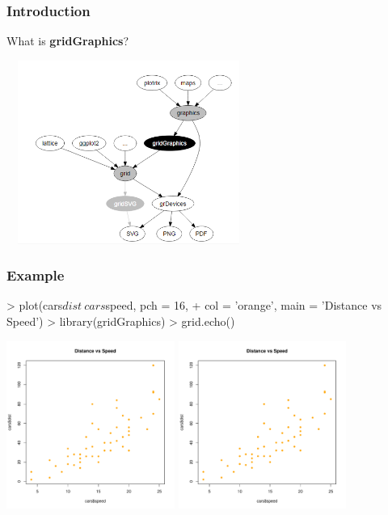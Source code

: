 \documentclass{beamer}
\begin{document}

\begin{frame}[fragile]

\frametitle{Introduction}

What is \textbf{gridGraphics}?
\begin{center}
\includegraphics[width = 8cm, height = 6cm]{plot/grid_graphics.png}
\end{center}

\end{frame}


\begin{frame}[fragile]
\frametitle{Example}
\begin{Schunk}
\begin{Sinput}
> plot(cars$dist ~ cars$speed, pch = 16, 
+      col = 'orange', main = 'Distance vs Speed')
> library(gridGraphics)
> grid.echo()
\end{Sinput}
\end{Schunk}

\begin{center}
  \includegraphics[height = 5.5cm, width = 5.5cm]{plot/intro_1.pdf}
  \includegraphics[height = 5.5cm, width = 5.5cm]{plot/intro_2.pdf}
\end{center}
\end{frame}
\end{document}
